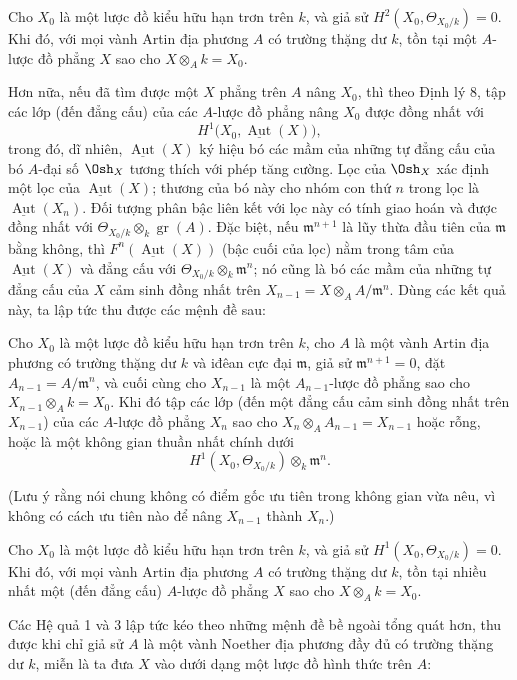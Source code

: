  Cho $X_0$ là một lược đồ kiểu hữu hạn trơn trên $k$, và
giả sử $H^2(X_0,\Theta_{X_0/k})=0$. Khi đó, với mọi vành Artin địa phương
$A$ có trường thặng dư $k$, tồn tại một $A$-lược đồ phẳng $X$ sao
cho $X\otimes_A k=X_0$.

Hơn nữa, nếu đã tìm được một $X$ phẳng trên $A$ nâng $X_0$, thì theo Định lý
8, tập các lớp (đến đẳng cấu) của các $A$-lược đồ phẳng nâng $X_0$ được đồng
nhất với
\[
  H^1\bigl(X_0,\underline{\operatorname{Aut}}(X)\bigr),
\]
trong đó, dĩ nhiên, $\underline{\operatorname{Aut}}(X)$ ký hiệu bó các mầm
của những tự đẳng cấu của bó $A$-đại số $\Osh_X$ tương thích với phép tăng
cường. Lọc của $\Osh_X$ xác định một lọc của
$\underline{\operatorname{Aut}}(X)$; thương của bó này cho nhóm con thứ
$n$ trong lọc là $\underline{\operatorname{Aut}}(X_n)$. Đối tượng phân bậc
liên kết với lọc này có tính giao hoán và được đồng nhất với
$\Theta_{X_0/k}\otimes_k\operatorname{gr}(A)$. Đặc biệt, nếu
$\mathfrak m^{n+1}$ là lũy thừa đầu tiên của $\mathfrak m$ bằng không, thì
$F^n(\underline{\operatorname{Aut}}(X))$ (bậc cuối của lọc) nằm trong tâm của
$\underline{\operatorname{Aut}}(X)$ và đẳng cấu với
$\Theta_{X_0/k}\otimes_k\mathfrak m^n$; nó cũng là bó các mầm của những tự
đẳng cấu của $X$ cảm sinh đồng nhất trên
$X_{n-1}=X\otimes_A A/\mathfrak m^n$. Dùng các kết quả này, ta lập tức thu
được các mệnh đề sau:

 Cho $X_0$ là một lược đồ kiểu hữu hạn trơn trên $k$, cho
$A$ là một vành Artin địa phương có trường thặng dư $k$ và iđêan cực đại
$\mathfrak m$, giả sử $\mathfrak m^{n+1}=0$, đặt
$A_{n-1}=A/\mathfrak m^n$, và cuối cùng cho $X_{n-1}$ là một
$A_{n-1}$-lược đồ phẳng sao cho $X_{n-1}\otimes_A k=X_0$. Khi đó tập các
lớp (đến một đẳng cấu cảm sinh đồng nhất trên $X_{n-1}$) của các $A$-lược đồ
phẳng $X_n$ sao cho $X_n\otimes_A A_{n-1}=X_{n-1}$ hoặc rỗng, hoặc là một
không gian thuần nhất chính dưới
\[
  H^1(X_0,\Theta_{X_0/k})\otimes_k\mathfrak m^n.
\]

(Lưu ý rằng nói chung không có điểm gốc ưu tiên trong không gian vừa nêu, vì
không có cách ưu tiên nào để nâng $X_{n-1}$ thành $X_n$.)

 Cho $X_0$ là một lược đồ kiểu hữu hạn trơn trên $k$, và
giả sử $H^1(X_0,\Theta_{X_0/k})=0$. Khi đó, với mọi vành Artin địa phương
$A$ có trường thặng dư $k$, tồn tại nhiều nhất một (đến đẳng cấu) $A$-lược đồ
phẳng $X$ sao cho $X\otimes_A k=X_0$.

Các Hệ quả 1 và 3 lập tức kéo theo những mệnh đề bề ngoài tổng quát hơn, thu
được khi chỉ giả sử $A$ là một vành Noether địa phương đầy đủ có trường thặng
dư $k$, miễn là ta đưa $X$ vào dưới dạng một lược đồ hình thức trên $A$:

